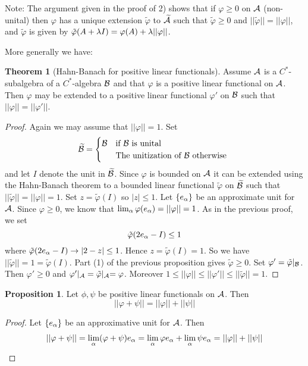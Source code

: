 \documentclass[10pt,english,a4paper]{article}
\theoremstyle{definition}
\newtheorem*{theorem}{Theorem}
\newtheorem*{proposition}{Proposition}
\def\tAs{\widetilde{\As}}
\def\tBs{\widetilde{\Bs}}
\def\tvphi{\tilde{\varphi}}
\def\vphi{\varphi}
\begin{document}
Note:
The argument given in the proof of 2) shows that if $\varphi \geq 0$ on $\mathcal{A}$ 
(non-unital) then $\varphi$ has a unique extension $\tvphi$ to $\tAs$ such that 
$\tvphi\geq 0$ and $||\tvphi|| = ||\vphi||$, and $\tvphi$ is given by
$\tvphi(A + \la I) = \vphi(A) + \la ||\vphi||$. 

More generally we have:  

\begin{theorem}[Hahn-Banach for positive linear functionals]
   Assume $\mathcal{A}$ is a $C^*$-subalgebra of a $C^*$-algebra $\mathcal{B}$ and that 
$\vphi$ is a positive linear functional on $\mathcal{A}$. Then $\varphi$ may be 
extended to a positive linear functional $\vphi'$ on $\mathcal{B}$ such that 
$||\vphi|| = ||\vphi'||$.
\end{theorem}

\begin{proof}
    Again we may assume that $||\vphi||=1$. Set 
\[ \widetilde{\mathcal{B}} = \begin{cases} \mathcal{B} &\text{if $\mathcal{B}$ is unital}\\ &\text{The unitization of $\mathcal{B}$ otherwise } \end{cases}\]
and let $I$ denote the unit in $\tBs$.
Since $\vphi$ is bounded on $\mathcal{A}$ it can be extended using the Hahn-Banach theorem 
to a bounded linear functional $\tvphi$ on $\tBs$ such that $||\tvphi|| =
||\vphi|| = 1$. Set $z = \tvphi(I)$ so $|z| \leq 1$. Let $\{e_{\alpha}\}$ be an 
approximate unit for $\mathcal{A}$. Since $\vphi \geq 0$, we know that $\lim_{\al} \vphi(e_{\al}) = ||\vphi|| = 1$. As in the previous proof, we set 
\[\tvphi(2e_{\al} - I) \leq 1\]
where $\tvphi(2e_{\al} - I) \to |2-z|\leq 1 $. Hence 
$z = \tvphi(I) = 1$. So we have $||\tvphi|| = 1 = \tvphi(I)$. Part (1) of the previous proposition
gives $\tvphi\geq 0$.
Set $\vphi' = \tvphi\lvert_{\Bs}$. Then $\vphi'\geq 0$ and 
$\vphi'\vert_{\As} = \tvphi\lvert_{\As}  = \vphi$. Moreover 
$1 \leq ||\vphi|| \leq ||\vphi'|| \leq ||\tvphi|| =1$.
\end{proof}

\begin{proposition}
    Let $\phi, \psi$ be positive linear functionals on $\mathcal{A}$. Then 
    \[ ||\vphi +\psi || = ||\vphi|| + ||\psi|| \]
\end{proposition}
\begin{proof}
    Let $\{e_{\alpha}\}$ be an approximative unit for $\mathcal{A}$. Then 
    \begin{align*}
        ||\vphi +\psi|| = \lim_{\al} (\vphi+\psi)e_{\al} = \lim_{\al}\vphi e_{\al}
        + \lim_{\al} \psi e_{\al} = ||\vphi ||+||\psi||
    \end{align*}    
\end{proof}
\end{document}

